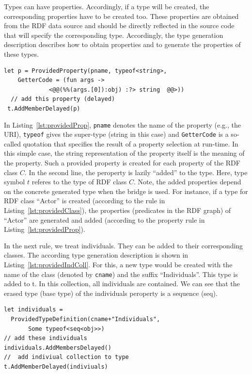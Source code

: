 \documentclass{llncs} %
\begin{document}
Types can have properties. Accordingly, if a type will be created, the corresponding properties
have to be created too. These properties are obtained from the RDF data source and should
be directly reflected in the source code that will specify the corresponding type.
Accordingly, the type generation description describes how to obtain properties and to
generate the properties of these types.

\begin{lstlisting}[style=code, caption={\textbf{Property Rule:} Add Property for Class C}, label={lst:providedProp}]
 let p = ProvidedProperty(pname, typeof<string>, 
    GetterCode = (fun args -> 
		     <@@(%%(args.[0]):obj) :?> string  @@>))
  // add this property (delayed)
 t.AddMemberDelayed(p)
 \end{lstlisting}

In Listing~\ref{lst:providedProp}, \texttt{pname} denotes the name of the property (e.g., the URI), \texttt{typeof} gives the
super-type (string in this case) and \texttt{GetterCode} is a so-called quotation that specifies the result of a property selection at run-time.
In this simple case, the string representation of the property itself is the meaning of the property. Such a provided property
is created for each property of the RDF class $C$.
In the second line, the peroperty is lazily ``added'' to the type. Here, type symbol $t$ referes to the
type of RDF class $C$. Note, the added properties depend on the concrete generated type 
when the bridge is used. For instance, if a type for RDF class ``Actor'' is created (according to the rule in Listing~\ref{lst:providedClass}),
the properties (predicates in the RDF graph) of ``Actor'' are generated and added (according to the property rule in Listing~\ref{lst:providedProp}).

In the next rule, we treat individuals. They can be added to their corresponding classes.
The according type generation description  is shown in Listing~\ref{lst:providedIndColl}.
For this, a new type would be created with the name of the class (denoted by \texttt{cname}) and the
suffix ``Individuals''. This type is added to t. In this collection, all individuals are contained.
We can see that the erased type (base type) of the individuals peroperty is a sequence (seq).

\begin{lstlisting}[style=code, caption={\textbf{Individual Rule:} Add Individuals (set / collection) to Class C}, label={lst:providedIndColl}]
let individuals = 
  ProvidedTypeDefinition(cname+"Individuals",
	   Some typeof<seq<obj>>)
// add these individuals
individuals.AddMembersDelayed()
//  add indiviual collection to type 
t.AddMemberDelayed(indiviuals)
 \end{lstlisting}
\end{document}
